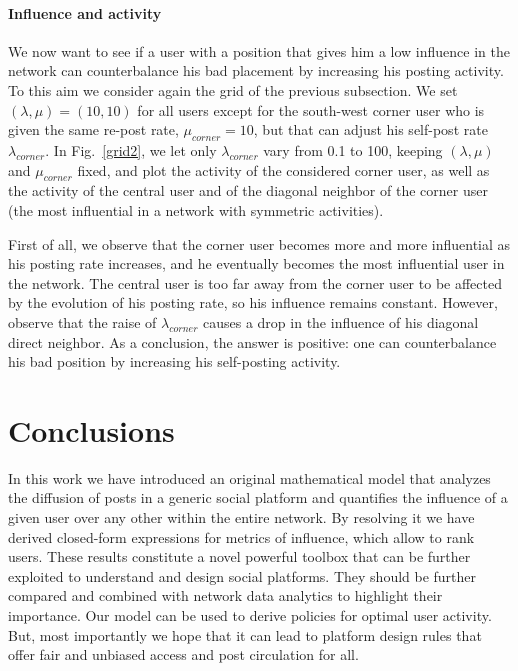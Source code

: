 \documentclass[10pt, conference, letterpaper]{IEEEtran}
\begin{document}
{\paragraph{Influence and activity}
We now want to see if a user with a position that gives him a low influence in the network can counterbalance his bad placement by increasing his posting activity. 
To this aim we consider again the grid of the previous subsection. We set $\left(\lambda, \mu\right) = \left(10, 10\right)$ for all users except for the south-west corner user who is given the same re-post rate, $\mu_{corner}=10$, but that can adjust his self-post rate $\lambda_{corner}$. In Fig.~\ref{grid2}, we let only $\lambda_{corner}$ vary from 0.1 to 100, keeping $(\lambda,\mu)$ and $\mu_{corner}$ fixed, and plot the activity of the considered corner user, as well as the activity of the central user and of the diagonal neighbor of the corner user (the most influential in a network with symmetric activities).

First of all,  we observe that the corner user becomes more and more influential as his posting rate increases,  and he eventually becomes the most influential user in the network. The central user is too far away from the corner user to be affected by the evolution of his posting rate, so his influence remains constant. However, observe that the raise of $\lambda_{corner}$ causes a drop in the influence of his diagonal direct neighbor.
As a conclusion, the answer is positive: one can counterbalance his bad position by increasing his self-posting activity.



\section{Conclusions}
\label{conclu}
In this work we have introduced an original mathematical model that analyzes the diffusion of posts in a generic social platform and quantifies the influence of a given user over any other within the entire network. By resolving it we have derived closed-form expressions for metrics of influence, which allow to rank users. These results constitute a novel powerful toolbox that can be further exploited to understand and design social platforms. They should be further compared and combined with network data analytics to highlight their importance. Our model can be used to derive policies for optimal user activity. But, most importantly we hope that it can lead to platform design rules that offer fair and unbiased access and post circulation for all.


}
\end{document}
